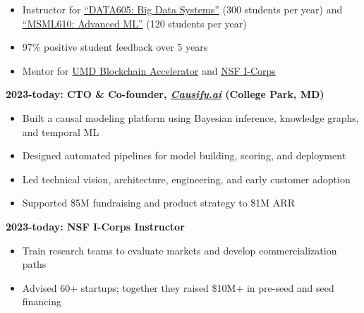 \documentclass[10pt, letterpaper]{article}
\providecommand{\tightlist}{%
\setlength{\itemsep}{0pt}
\setlength{\parskip}{0pt}}
\begin{document}
  \begin{itemize}
    \tightlist

    \item Instructor for
      \href{https://docs.google.com/document/d/1LYd7QqGOU2_JR5QOWaAxWCwBB2cy16n57dSaVV6A3tc/edit?tab=t.0\#heading=h.d1dedvxmz9pw}{``DATA605:
      Big Data Systems''} (300 students per year) and
      \href{https://docs.google.com/document/d/1YXCrqh6KGg3xm4-Lr4QGdBnjeWEfkqz67FHNHB_rdAk/edit?tab=t.0\#heading=h.278ryn4xodsb}{``MSML610:
      Advanced ML''} (120 students per year)

    \item 97\% positive student feedback over 5 years

    \item Mentor for \href{https://www.rhsmith.umd.edu/centers-initiatives/supply-chain-management-center/initiatives-programs/blockchain-accelerator}{UMD
      Blockchain Accelerator} and \href{https://beta.nsf.gov/funding/initiatives/i-corps}{NSF
      I-Corps}
  \end{itemize}

  \textbf{2023-today: CTO \& Co-founder,
  \href{http://Causify.ai}{\emph{Causify.ai}} (College Park, MD)}

  \begin{itemize}
    \tightlist

    \item Built a causal modeling platform using Bayesian inference,
      knowledge graphs, and temporal ML

    \item Designed automated pipelines for model building, scoring, and deployment

    \item Led technical vision, architecture, engineering, and early
      customer adoption

    \item Supported \$5M fundraising and product strategy to \$1M ARR
  \end{itemize}

  \textbf{2023-today: NSF I-Corps Instructor}

  \begin{itemize}
    \tightlist

    \item Train research teams to evaluate markets and develop commercialization
      paths

    \item Advised 60+ startups; together they raised \$10M+ in pre-seed and
      seed financing
  \end{itemize}
\end{document}
